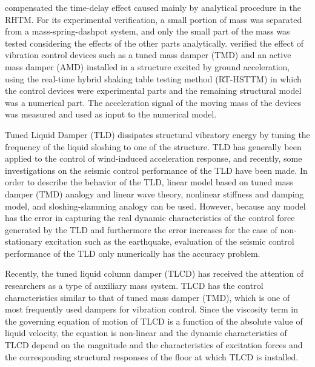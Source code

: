 \citet{horiuchi1999development} compensated the time-delay effect caused mainly by analytical procedure in the RHTM\citep{horiuchi1999development}. For its experimental verification, a small portion of mass was separated from a mass-spring-dashpot system, and only the small part of the mass was tested considering the effects of the other parts analytically. \citet{iemura1999substructured,igarashi2000development} verified the effect of vibration control devices such as a tuned mass damper (TMD) and an active mass damper (AMD) installed in a structure excited by ground acceleration, using the real-time hybrid shaking table testing method (RT-HSTTM) in which the control devices were experimental parts and the remaining structural model was a numerical part. The acceleration signal of the moving mass of the devices was measured and used as input to the numerical model\cite{iemura1999substructured,igarashi2000development}.

Tuned Liquid Damper (TLD) dissipates structural vibratory energy by tuning the frequency of the liquid sloshing to one of the structure\citep{soong1997passive}. TLD has generally been applied to the control of wind-induced acceleration response\citep{chang1998unified}, and recently, some investigations on the seismic control performance of the TLD have been made\citep{banerji2000tuned}. In order to describe the behavior of the TLD, linear model based on tuned mass damper (TMD) analogy\citep{sun1995properties} and linear wave theory, nonlinear stiffness and damping model\citep{yu1999non}, and sloshing-slamming analogy\citep{yalla2001liquid} can be used. However, because any model has the error in capturing the real dynamic characteristics of the control force generated by the TLD and furthermore the error increases for the case of non-stationary excitation such as the earthquake, evaluation of the seismic control performance of the TLD only numerically has the accuracy problem.

Recently, the tuned liquid column damper (TLCD) has received the attention of researchers as a type of auxiliary mass system\citep{samali1998wind}. TLCD has the control characteristics similar to that of tuned mass damper (TMD), which is one of most frequently used dampers for vibration control. Since the viscosity term in the governing equation of motion of TLCD is a function of the absolute value of liquid velocity, the equation is non-linear and the dynamic characteristics of TLCD depend on the magnitude and the characteristics of excitation forces and the corresponding structural responses of the floor at which TLCD is installed\citep{yalla2001liquid}.

